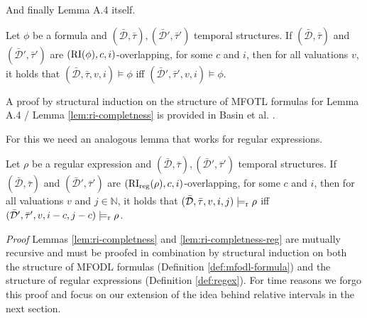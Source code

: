 And finally Lemma A.4 itself.
\begin{lemma}
    \label{lem:ri-completness}
    Let $\phi$ be a formula and $(\bar{\mathcal{D}}, \bar{\tau}), (\bar{\mathcal{D}}', \bar{\tau}')$ temporal structures.
    If $(\bar{\mathcal{D}}, \bar{\tau})$ and $(\bar{\mathcal{D}}', \bar{\tau}')$ are $(\operatorname{RI}(\phi),c,i)$-overlapping, for some $c$ and $i$, then for all valuations $v$, it holds that $(\bar{\mathcal{D}}, \bar{\tau},v,i) \models \phi$ iff $(\bar{\mathcal{D}}',\bar{\tau}',v,i) \models \phi$.
\end{lemma}

A proof by structural induction on the structure of MFOTL formulas for Lemma A.4 \cite{Basin2016} / Lemma \ref{lem:ri-completness} is provided in Basin et al. \cite{Basin2016}.

For this we need an analogous lemma that works for regular expressions.

\begin{lemma}
    \label{lem:ri-completness-reg}
    Let $\rho$ be a regular expression and $(\bar{\mathcal{D}}, \bar{\tau}), (\bar{\mathcal{D}}', \bar{\tau}')$ temporal structures.
    If $(\bar{\mathcal{D}}, \bar{\tau})$ and $(\bar{\mathcal{D}}', \bar{\tau}')$ are $(\operatorname{RI}_{\text{reg}}(\rho),c,i)$-overlapping, for some $c$ and $i$, then for all valuations $v$ and $j \in \mathbb{N}$, it holds that $(\bar{\mathcal{D}}, \bar{\tau},v,i,j) \models_{\text{r}} \rho$ iff $(\bar{\mathcal{D}}',\bar{\tau}',v,i-c,j-c) \models_{\text{r}} \rho$.
\end{lemma}

\textit{Proof}
Lemmas \ref{lem:ri-completness} and \ref{lem:ri-completness-reg} are mutually recursive and must be proofed in combination by structural induction on both the structure of MFODL formulas (Definition \ref{def:mfodl-formula}) and the structure of regular expressions (Definition \ref{def:regex}).
For time reasons we forgo this proof and focus on our extension of the idea behind relative intervals in the next section.



